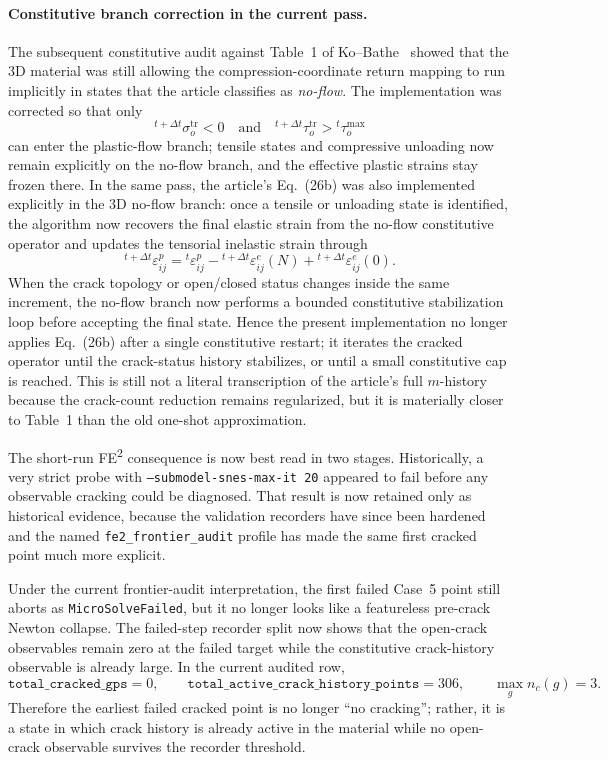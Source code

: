 \paragraph{Constitutive branch correction in the current pass.}
The subsequent constitutive audit against Table~1 of
Ko--Bathe~\cite{KoBathe2026} showed that the 3D material was still allowing
the compression-coordinate return mapping to run implicitly in states that the
article classifies as \emph{no-flow}.  The implementation was corrected so
that only
\[
  {}^{t+\Delta t}\sigma_o^{\mathrm{tr}} < 0
  \quad\text{and}\quad
  {}^{t+\Delta t}\tau_o^{\mathrm{tr}} > {}^{t}\tau_o^{\max}
\]
can enter the plastic-flow branch; tensile states and compressive unloading
now remain explicitly on the no-flow branch, and the effective plastic strains
stay frozen there.  In the same pass, the article's Eq.~(26b) was also
implemented explicitly in the 3D no-flow branch: once a tensile or unloading
state is identified, the algorithm now recovers the final elastic strain from
the no-flow constitutive operator and updates the tensorial inelastic strain
through
\[
  {}^{t+\Delta t}\!\varepsilon^{p}_{ij}
  =
  {}^{t}\!\varepsilon^{p}_{ij}
  -
  {}^{t+\Delta t}\!\varepsilon^{e}_{ij}(N)
  +
  {}^{t+\Delta t}\!\varepsilon^{e}_{ij}(0).
\]
When the crack topology or open/closed status changes inside the same
increment, the no-flow branch now performs a bounded constitutive
stabilization loop before accepting the final state.  Hence the present
implementation no longer applies Eq.~(26b) after a single constitutive
restart; it iterates the cracked operator until the crack-status history
stabilizes, or until a small constitutive cap is reached.  This is still not a
literal transcription of the article's full \(m\)-history because the
crack-count reduction remains regularized, but it is materially closer to
Table~1 than the old one-shot approximation.

The short-run FE\textsuperscript{2} consequence is now best read in two
stages.  Historically, a very strict probe with
\texttt{--submodel-snes-max-it 20} appeared to fail before any observable
cracking could be diagnosed.  That result is now retained only as historical
evidence, because the validation recorders have since been hardened and the
named \texttt{fe2\_frontier\_audit} profile has made the same first cracked
point much more explicit.

Under the current frontier-audit interpretation, the first failed Case~5 point
still aborts as \texttt{MicroSolveFailed}, but it no longer looks like a
featureless pre-crack Newton collapse.  The failed-step recorder split now
shows that the open-crack observables remain zero at the failed target while
the constitutive crack-history observable is already large.  In the current
audited row,
\[
  \texttt{total\_cracked\_gps} = 0,
  \qquad
  \texttt{total\_active\_crack\_history\_points} = 306,
  \qquad
  \max_g n_c(g) = 3.
\]
Therefore the earliest failed cracked point is no longer ``no cracking'';
rather, it is a state in which crack history is already active in the material
while no open-crack observable survives the recorder threshold.

